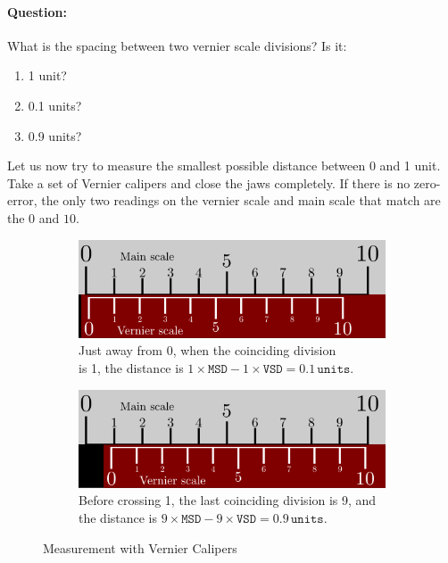 \begin{question}
    \paragraph{Question:} What is the spacing between two vernier scale divisions? Is it:
    \begin{enumerate}
        \item 1 unit?
        \item 0.1 units?
        \item 0.9 units?
    \end{enumerate}
\end{question}

Let us now try to measure the smallest possible distance between 0 and 1 unit. Take a set of Vernier calipers and close the jaws completely. If there is no zero-error, the only two readings on the vernier scale and main scale that match are the $0$ and $10$.

\begin{figure}[!htb]
        \begin{subfigure}[b]{0.5\textwidth}
                \includegraphics[width=0.95\linewidth]{figs/vernier2.png}
                \caption{Just away from 0, when the coinciding division \\is 1, the distance is $1\times\texttt{MSD}-1\times\texttt{VSD}=0.1\, \texttt{units}$.}
                \label{fig:vernier_2}
        \end{subfigure}\hfill
        \begin{subfigure}[b]{0.5\textwidth}
                \includegraphics[width=0.95\linewidth]{figs/vernier3.png}
                \caption{Before crossing 1, the last coinciding division is 9, and the distance is $9\times\texttt{MSD}-9\times\texttt{VSD}=0.9\, \texttt{units}$.}
                \label{fig:vernier_3}
        \end{subfigure}%
        \caption{Measurement with Vernier Calipers}
        \label{fig:verniermeasurements}
\end{figure}

